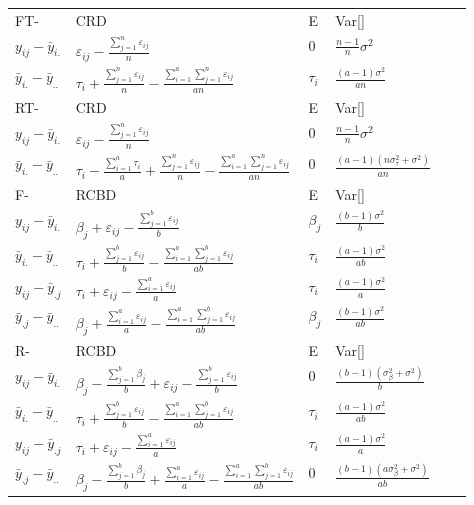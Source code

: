 \documentclass[10pt,portrait]{article}
\begin{document}
\begin{multicols}{2}
\begin{tabular}{l|l|l|l|l|l}
FT- &CRD & E & Var[]\\
$y_{ij}-\bar y_{i.}$ & $\varepsilon_{ij}-\frac{\sum_{j=1}^n\varepsilon_{ij}}n$ & $0$ & $\frac{n-1}n\sigma^2$\\
$\bar y_{i.}-\bar y_{..}$ & $\tau_{i}+\frac{\sum_{j=1}^n\varepsilon_{ij}}n-\frac{\sum_{i=1}^a\sum_{j=1}^n\varepsilon_{ij}}{an}$ & $\tau_i$ & $\frac{(a-1)\sigma^2}{an}$\\
\hline
RT- &CRD & E & Var[]\\
$y_{ij}-\bar y_{i.}$ & $\varepsilon_{ij}-\frac{\sum_{j=1}^n\varepsilon_{ij}}n$ & $0$ & $\frac{n-1}n\sigma^2$\\
$\bar y_{i.}-\bar y_{..}$ & $\tau_{i}-\frac{\sum_{i=1}^a\tau_{i}}{a}+\frac{\sum_{j=1}^n\varepsilon_{ij}}n-\frac{\sum_{i=1}^a\sum_{j=1}^n\varepsilon_{ij}}{an}$ & $0$ & $\frac{(a-1)(n\sigma_{\tau}^2+\sigma^2)}{an}$\\
\hline
F- &RCBD & E & Var[]\\
$y_{ij}-\bar y_{i.}$ & $\beta_{j}+\varepsilon_{ij}-\frac{\sum_{j=1}^b\varepsilon_{ij}}b$ & $\beta_j$ & $\frac{(b-1)\sigma^2}b$\\
$\bar y_{i.}-\bar y_{..}$ & $\tau_{i}+\frac{\sum_{j=1}^b\varepsilon_{ij}}b-\frac{\sum_{i=1}^a\sum_{j=1}^b\varepsilon_{ij}}{ab}$ & $\tau_i$ & $\frac{(a-1)\sigma^2}{ab}$\\
$y_{ij}-\bar y_{.j}$ & $\tau_{i}+\varepsilon_{ij}-\frac{\sum_{i=1}^a\varepsilon_{ij}}a$ & $\tau_i$ & $\frac{(a-1)\sigma^2}a$\\
$\bar y_{.j}-\bar y_{..}$ & $\beta_{j}+\frac{\sum_{i=1}^a\varepsilon_{ij}}a-\frac{\sum_{i=1}^a\sum_{j=1}^b\varepsilon_{ij}}{ab}$ & $\beta_j$ & $\frac{(b-1)\sigma^2}{ab}$\\
\hline
R- &RCBD & E & Var[]\\
$y_{ij}-\bar y_{i.}$ & $\beta_{j}-\frac{\sum_{j=1}^b\beta_{j}}b+\varepsilon_{ij}-\frac{\sum_{j=1}^b\varepsilon_{ij}}b$ & $0$ & $\frac{(b-1)(\sigma_{\beta}^2+\sigma^2)}b$\\
$\bar y_{i.}-\bar y_{..}$ & $\tau_{i}+\frac{\sum_{j=1}^b\varepsilon_{ij}}b-\frac{\sum_{i=1}^a\sum_{j=1}^b\varepsilon_{ij}}{ab}$ & $\tau_i$ & $\frac{(a-1)\sigma^2}{ab}$\\
$y_{ij}-\bar y_{.j}$ & $\tau_{i}+\varepsilon_{ij}-\frac{\sum_{i=1}^a\varepsilon_{ij}}a$ & $\tau_i$ & $\frac{(a-1)\sigma^2}a$\\
$\bar y_{.j}-\bar y_{..}$ & $\beta_j-\frac{\sum_{j=1}^b\beta_j}{b}+\frac{\sum_{i=1}^a\varepsilon_{ij}}a-\frac{\sum_{i=1}^a\sum_{j=1}^b\varepsilon_{ij}}{ab}$ & $0$ & $\frac{(b-1)(a\sigma_{\beta}^2+\sigma^2)}{ab}$\\
\end{tabular}


\end{multicols}
\end{document}
